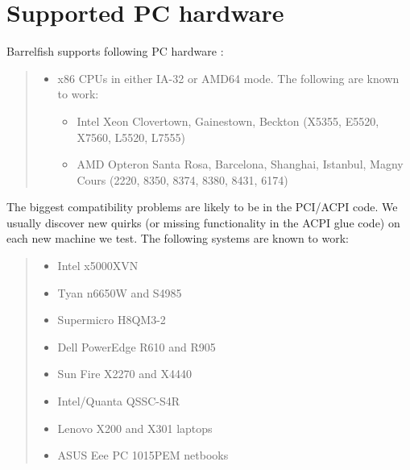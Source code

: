 \section{Supported PC hardware%
  \label{supported-pc-hardware}%
}

Barrelfish supports following PC hardware :
%
\begin{quote}
%
\begin{itemize}

\item x86 CPUs in either IA-32 or AMD64 mode. The following are known to work:
%
\begin{itemize}

\item Intel Xeon Clovertown, Gainestown, Beckton (X5355, E5520, X7560, L5520,
L7555)

\item AMD Opteron Santa Rosa, Barcelona, Shanghai, Istanbul, Magny Cours
(2220, 8350, 8374, 8380, 8431, 6174)

\end{itemize}

\end{itemize}

\end{quote}

The biggest compatibility problems are likely to be in the PCI/ACPI code. We
usually discover new quirks (or missing functionality in the ACPI glue code)
on each new machine we test. The following systems are known to work:
%
\begin{quote}
%
\begin{itemize}

\item Intel x5000XVN

\item Tyan n6650W and S4985

\item Supermicro H8QM3-2

\item Dell PowerEdge R610 and R905

\item Sun Fire X2270 and X4440

\item Intel/Quanta QSSC-S4R

\item Lenovo X200 and X301 laptops

\item ASUS Eee PC 1015PEM netbooks

\end{itemize}

\end{quote}

